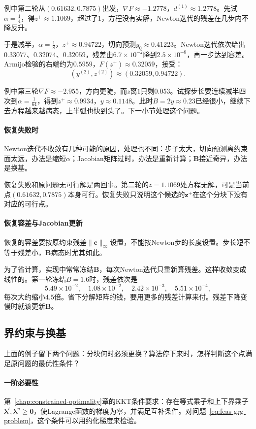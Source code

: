 例中第二轮从$(0.61632,0.7875)$出发，$\nabla F\approx-1.2778$，$d^{(1)}\approx1.2778$。先试$\alpha=\tfrac14$，得$z^{+}\approx1.1069$，超过了$1$，方程没有实解，Newton迭代的残差在几步内不降反升。

于是减半，$\alpha=\tfrac18$，$z^{+}\approx0.94722$，切向预测$y_0\approx0.41223$。Newton迭代依次给出$0.33077$、$0.32074$、$0.32059$，残差由$6.7\times10^{-2}$降到$2.5\times10^{-8}$，再一步达到容差。Armijo检验的右端约为$0.5959$，$F(z^{+})\approx0.32059$，接受：
\[
 (y^{(2)},z^{(2)})\approx(0.32059,0.94722).
\]

例中第三轮$\nabla F\approx-2.955$，方向更陡，而$z$离$1$只剩$0.053$。试探步长要连续减半四次到$\alpha=\tfrac{1}{64}$，得到$z^{+}\approx0.9934$，$y\approx0.1148$。此时$B=2y\approx0.23$已经很小，继续下去方程越来越病态，上半弧也快到头了。下一小节处理这个问题。

\paragraph{恢复失败时}
Newton迭代不收敛有几种可能的原因，处理也不同：步子太大，切向预测离约束面太远，办法是缩短$\alpha$；Jacobian矩阵过时，办法是重新计算；$\bm{B}$接近奇异，办法是换基。

恢复失败和原问题无可行解是两回事。第二轮的$z=1.1069$处方程无解，可是当前点$(0.61632,0.7875)$本身可行。恢复失败只说明这个候选的$\bm{z}^{+}$在这个分块下没有对应的可行点。

\paragraph{恢复容差与Jacobian更新}
恢复的容差要按原约束残差$\lVert\bm{c}\rVert_\infty$设置，不能按Newton步的长度设置。步长短不等于残差小，$\bm{B}$病态时尤其如此。

为了省计算，实现中常常冻结$\bm{B}$，每次Newton迭代只重新算残差。这样收敛变成线性的。第一轮冻结$B=1.6$时，残差依次是
\[
 5.49\times10^{-2},\quad1.08\times10^{-2},\quad2.42\times10^{-3},\quad5.51\times10^{-4},
\]
每次大约缩小$4.5$倍。省下分解矩阵的钱，要用更多的残差计算来付。残差下降变慢时就该更新$\bm{B}$。

\subsection{界约束与换基}
\label{sec:feas-grg-basis}

上面的例子留下两个问题：分块何时必须更换？算法停下来时，怎样判断这个点满足原问题的最优性条件？

\paragraph{一阶必要性}
第~\ref{chap:constrained-optimality}章的KKT条件要求：存在等式乘子和上下界乘子$\bm{\lambda}^{l},\bm{\lambda}^{u}\geq\bm{0}$，使Lagrange函数的梯度为零，并满足互补条件。对问题~\eqref{eq:feas-grg-problem}，这个条件可以用约化梯度来检验。

